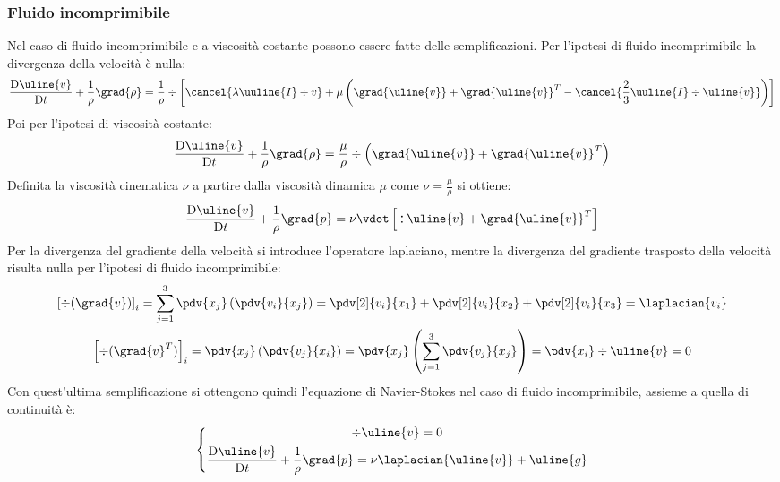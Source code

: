 \subsubsection{Fluido incomprimibile}
Nel caso di fluido incomprimibile e a viscosità costante possono essere fatte delle semplificazioni.
Per l'ipotesi di fluido incomprimibile la divergenza della velocità è nulla:
%
	\begin{equation*}
		\frac{\mathrm{D} \uline{v}}{\mathrm{D} t} + \frac{1}{\rho} \grad{\rho} = \frac{1}{\rho} \div{\left[ \cancel{ \lambda \uuline{I} \div{v} } + \mu \left( \grad{\uline{v}} + \grad{\uline{v}}^T - \cancel{ \frac{2}{3} \uuline{I} \div{\uline{v}} } \right)\right]}
	\end{equation*}
%
Poi per l'ipotesi di viscosità costante:
%
	\begin{equation*}
		\frac{\mathrm{D} \uline{v}}{\mathrm{D} t} + \frac{1}{\rho} \grad{\rho} = \frac{\mu}{\rho} \div{\left( \grad{\uline{v}} + \grad{\uline{v}}^T \right)}
	\end{equation*}
%
Definita la viscosità cinematica $\nu$ a partire dalla viscosità dinamica $\mu$ come $\nu = \frac{\mu}{\rho}$ si ottiene:
%
	\begin{equation*}
		\frac{\mathrm{D} \uline{v}}{\mathrm{D} t} + \frac{1}{\rho} \grad{p} = \nu \vdot \left[ \div{\uline{v}} + \grad{\uline{v}}^T \right]
	\end{equation*}
%
Per la divergenza del gradiente della velocità si introduce l'operatore laplaciano, mentre la divergenza del gradiente trasposto della velocità risulta nulla per l'ipotesi di fluido incomprimibile:
%
	\begin{equation*}
		\begin{gathered}
			{\left[ \div{(\grad{v})} \right]}_i = \sum_{j=1}^3  \pdv{x_j} \left( \pdv{v_i}{x_j} \right) = \pdv[2]{v_i}{x_1} + \pdv[2]{v_i}{x_2}  + \pdv[2]{v_i}{x_3} = \laplacian{v_i}\\
			{\left[ \div{(\grad{v}^T)} \right]}_i = \pdv{x_j} \left( \pdv{v_j}{x_i} \right) = \pdv{x_j} \left( \sum_{j=1}^3 \pdv{v_j}{x_j} \right) = \pdv{x_i} \div{\uline{v}} = 0	
		\end{gathered}
	\end{equation*}
%
Con quest'ultima semplificazione si ottengono quindi l'equazione di Navier-Stokes nel caso di fluido incomprimibile, assieme a quella di continuità è:
%
	\begin{equation*}
		\left\{
			\begin{gathered}
				\div{\uline{v}} = 0\\
				\frac{\mathrm{D} \uline{v}}{\mathrm{D} t} + \frac{1}{\rho} \grad{p} = \nu \laplacian{\uline{v}} + \uline{g}
			\end{gathered}
		\right.
	\end{equation*}
%

